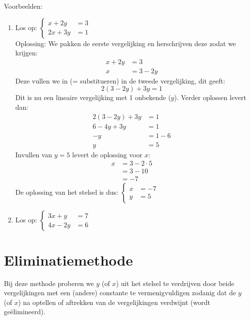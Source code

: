 Voorbeelden:
\begin{enumerate}
    \item Los op: 
        $\begin{cases}
            x+2y&=3\\
            2x+3y&=1
        \end{cases}$ \\
        Oplossing: We pakken de eerste vergelijking en herschrijven deze zodat we krijgen: 
        \begin{align*}    
            x+2y&=3 \\
            x&=3-2y
        \end{align*}
        Deze vullen we in (= substitueren) in de tweede vergelijking, dit geeft: 
        \[2(3-2y)+3y=1\]
        Dit is nu een lineaire vergelijking met 1 onbekende ($y$). Verder oplossen levert dan:	
        \begin{align*}
            2(3-2y)+3y&=1 \\
            6-4y+3y&=1 \\
            -y&=1-6 \\
            y&=5
        \end{align*}
        Invullen van $y=5$ levert de oplossing voor $x$: 
        \begin{align*}
            x&=3-2\cdot 5 \\
            &=3-10 \\
            &=-7
        \end{align*}
        De oplossing van het stelsel is dus: 
        $\begin{cases}
            x&=-7 \\
            y&=5
        \end{cases}$
    \item 	Los op:
    $\begin{cases}
    3x+y&=7 \\
    4x-2y&=6 
    \end{cases}$
\end{enumerate}
	
\newpage
\section{Eliminatiemethode}
Bij deze methode proberen we $y$ (of $x$) uit het stelsel te verdrijven door beide vergelijkingen met een (andere) constante te vermenigvuldigen zodanig dat de $y$ (of $x$) na optellen of aftrekken van de vergelijkingen verdwijnt (wordt ge\"elimineerd).

